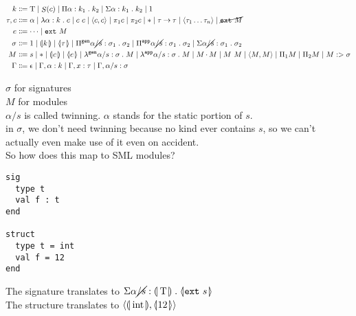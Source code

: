 \begin{align*}
k & \bnfdef \type \bnfalt \singleton{c} \bnfalt \Pi\bind{\alpha \of k_1}{k_2}
    \bnfalt \Sigma\bind{\alpha \of k_1}{k_2} \bnfalt 1 \\
\tau, c
  & \bnfdef \alpha \bnfalt \lambda\bind{\alpha \of k}{c} \bnfalt \ap{c}{c}
    \bnfalt \pair{c, c} \bnfalt \pi_1 c \bnfalt \pi_2 c \bnfalt \ast
    \bnfalt \tau \arrow \tau \bnfalt \prodn{\tau} \bnfalt \cancel{\ext{M}} \\
e & \bnfdef \dots \bnfalt \ext{M} \\
\sigma & \bnfdef 1 \bnfalt \satom{k} \bnfalt \datom{\tau}
         \bnfalt \Pi^\texttt{gen}\bind{\alpha\cancel{/s} \of \sigma_1}{\sigma_2}
         \bnfalt \Pi^\texttt{app}\bind{\alpha\cancel{/s} \of \sigma_1}{\sigma_2}
         \bnfalt \Sigma\bind{\alpha\cancel{/s} \of \sigma_1}{\sigma_2} \\
M & \bnfdef s \bnfalt \ast \bnfalt \satom{c} \bnfalt \datom{e}
    \bnfalt \lambda^\texttt{gen}\bind{\alpha/s \of \sigma}{M}
    \bnfalt \lambda^\texttt{app}\bind{\alpha/s \of \sigma}{M}
    \bnfalt \Ap{M}{M}
    \bnfalt \ap{M}{M}
    \bnfalt \pair{M, M}
    \bnfalt \Pi_1 M
    \bnfalt \Pi_2 M
    \bnfalt M :> \sigma
    \\
\Gamma & \bnfdef \epsilon \bnfalt \Gamma, \alpha \of k \bnfalt \Gamma, x \of \tau
         \bnfalt \Gamma, \alpha/s \of \sigma \\
\end{align*}

$\sigma$ for signatures \\
$M$ for modules \\
$\alpha/s$ is called twinning.
$\alpha$ stands for the static portion of $s$. \\
in $\sigma$, we don't need twinning because no kind ever contains $s$, so
we can't actually even make use of it even on accident. \\

So how does this map to SML modules? \\
\begin{lstlisting}
sig
  type t
  val f : t
end

struct
  type t = int
  val f = 12
end
\end{lstlisting}
The signature translates to $\Sigma\bind{\alpha\cancel{/s} \of \satom{\type}}{\datom{\ext{s}}}$ \\
The structure translates to $\pair{\satom{\intt}, \datom{12}}$ \\

